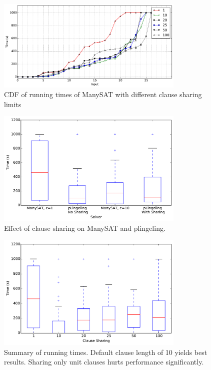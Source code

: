 \documentclass{article}
\begin{document}
\begin{figure}[h]
  \centering
  \includegraphics[width=0.8\textwidth]{../figs/scatter_cdf.pdf}
  \caption{CDF of running times of ManySAT with different clause sharing limits}
  \label{fig:scatter-2}
\end{figure}


\begin{figure}[h]
  \centering
  \includegraphics[width=0.8\textwidth]{../figs/cmp_box.pdf}
  \caption{Effect of clause sharing on ManySAT and plingeling.}
  \label{fig:cmp-1}
\end{figure}

\begin{figure}[h]
  \centering
    \includegraphics[width=0.8\textwidth]{../figs/boxplot_all.pdf}
  \caption{Summary of running times. Default clause length of 10 yields best results. Sharing only unit clauses hurts performance significantly.}
  \label{fig:boxplot-1}
\end{figure}
\end{document}
